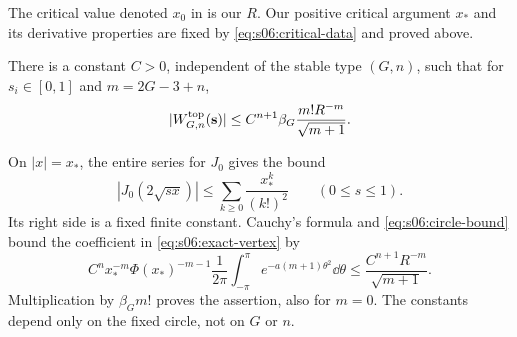 \begin{rmk}
The critical value denoted $x_0$ in
\cite[\S 6, (17) and proof of 6.3]{MaZ00} is our $R$.
Our positive critical argument $x_*$ and its derivative properties
are fixed by \eqref{eq:s06:critical-data} and proved above.
\end{rmk}

\begin{lmm}\label{lmm:s06:vertex-bound}
There is a constant $C>0$, independent of the stable type $(G,n)$,
such that for $s_i\in[0,1]$ and $m=2G-3+n$,
\begin{equation}\label{eq:s06:vertex-bound}
 |W^{\rm top}_{G,n}(\mathbf s)|
 \leq C^{n+1}\beta_G\frac{m!R^{-m}}{\sqrt{m+1}}.
\end{equation}
\end{lmm}
\begin{prf}
On $|x|=x_*$, the entire series for $J_0$ gives the bound
\[
 |J_0(2\sqrt{s x})|
 \leq\sum_{k\geq0}\frac{x_*^k}{(k!)^2}
 \qquad(0\leq s\leq1).
\]
Its right side is a fixed finite constant. Cauchy's formula and
\eqref{eq:s06:circle-bound} bound the coefficient in
\eqref{eq:s06:exact-vertex} by
\[
 C^n x_*^{-m}\Phi(x_*)^{-m-1}
 \frac1{2\pi}\int_{-\pi}^{\pi}e^{-a(m+1)\theta^2}\dd\theta
 \leq\frac{C^{n+1}R^{-m}}{\sqrt{m+1}}.
\]
Multiplication by $\beta_Gm!$ proves the assertion, also for $m=0$.
The constants depend only on the fixed circle, not on $G$ or $n$.
\end{prf}
